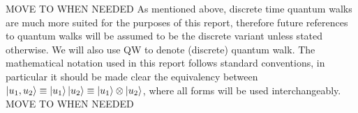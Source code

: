 MOVE TO WHEN NEEDED
As mentioned above, discrete time quantum walks are much more suited for the purposes of this report, therefore future references to quantum walks will be assumed to be the discrete variant unless stated otherwise. 
We will also use QW to denote (discrete) quantum walk. 
The mathematical notation used in this report follows standard conventions, in particular it should be made clear the equivalency between $\ket{u_1, u_2}\equiv\ket{u_1}\ket{u_2} \equiv \ket{u_1} \otimes \ket{u_2}$, where all forms will be used interchangeably.
MOVE TO WHEN NEEDED